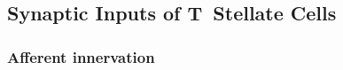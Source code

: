 \subsection{Synaptic Inputs of T~Stellate Cells}\label{sec:synaptic-inputs-tstellate}


 \subsubsection{Afferent innervation}

